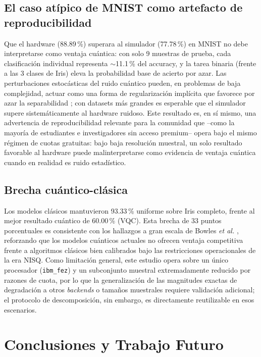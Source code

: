 \documentclass[conference]{IEEEtran}
\begin{document}
\subsection{El caso atípico de MNIST como artefacto de reproducibilidad}
Que el hardware (88.89\,\%) superara al simulador (77.78\,\%) en MNIST no debe interpretarse como ventaja cuántica: con solo 9 muestras de prueba, cada clasificación individual representa $\sim$11.1\,\% del accuracy, y la tarea binaria (frente a las 3 clases de Iris) eleva la probabilidad base de acierto por azar. Las perturbaciones estocásticas del ruido cuántico pueden, en problemas de baja complejidad, actuar como una forma de regularización implícita que favorece por azar la separabilidad \cite{huang2021}; con datasets más grandes es esperable que el simulador supere sistemáticamente al hardware ruidoso. Este resultado es, en sí mismo, una advertencia de reproducibilidad relevante para la comunidad que --como la mayoría de estudiantes e investigadores sin acceso premium-- opera bajo el mismo régimen de cuotas gratuitas: bajo baja resolución muestral, un solo resultado favorable al hardware puede malinterpretarse como evidencia de ventaja cuántica cuando en realidad es ruido estadístico.

\subsection{Brecha cuántico-clásica}
Los modelos clásicos mantuvieron 93.33\,\% uniforme sobre Iris completo, frente al mejor resultado cuántico de 60.00\,\% (VQC). Esta brecha de 33 puntos porcentuales es consistente con los hallazgos a gran escala de Bowles \textit{et al.} \cite{bowles2024}, reforzando que los modelos cuánticos actuales no ofrecen ventaja competitiva frente a algoritmos clásicos bien calibrados bajo las restricciones operacionales de la era NISQ. Como limitación general, este estudio opera sobre un único procesador (\texttt{ibm\_fez}) y un subconjunto muestral extremadamente reducido por razones de cuota, por lo que la generalización de las magnitudes exactas de degradación a otros \textit{backends} o tamaños muestrales requiere validación adicional; el protocolo de descomposición, sin embargo, es directamente reutilizable en esos escenarios.

\section{Conclusiones y Trabajo Futuro}
\label{sec:conclusiones}
\end{document}
